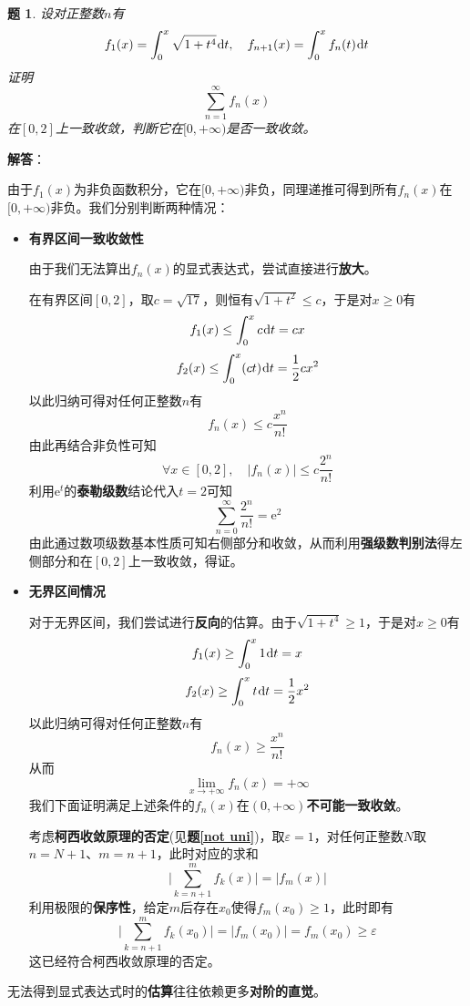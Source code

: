 \documentclass[a4paper,UTF8,fontset=windows,AutoFakeBold]{ctexart}
\newcommand*{\dr}{\hspace{0.07em}\mathrm{d}}
\newcommand*{\er}{\mathrm{e}}
\newcommand*{\suminf}[1][n=1]{\sum_{#1}^\infty}
\newcommand*{\note}{\noindent *}
\theoremstyle{ex}
\newtheorem{exercise}{题}
\newcommand{\exref}[1]{\textbf{题\;\ref{#1}\;}}
\newcommand{\sol}[1]{{\vspace{5pt}\kaishu\noindent\textbf{解答}：\vspace{-3pt}
\begin{compactitem}
    \item[] #1
\end{compactitem}
}}
\begin{document}
\begin{framed}
\begin{exercise}
    设对正整数$n$有
    $$f_1(x)=\int_0^x\sqrt{1+t^4}\dr t,\quad f_{n+1}(x)=\int_0^xf_n(t)\dr t$$
    证明
    $$\suminf f_n(x)$$
    在$[0,2]$上一致收敛，判断它在$[0,+\infty)$是否一致收敛。
\end{exercise}
\sol{
    由于$f_1(x)$为非负函数积分，它在$[0,+\infty)$非负，同理递推可得到所有$f_n(x)$在$[0,+\infty)$非负。我们分别判断两种情况：
    \begin{itemize}
        \item \textbf{有界区间一致收敛性}
        
        由于我们无法算出$f_n(x)$的显式表达式，尝试直接进行\textbf{放大}。

        在有界区间$[0,2]$，取$c=\sqrt{17}$，则恒有$\sqrt{1+t^2}\le c$，于是对$x\ge0$有
        $$f_1(x)\le\int_0^xc\dr t=cx$$
        $$f_2(x)\le\int_0^x(ct)\dr t=\frac{1}{2}cx^2$$
        以此归纳可得对任何正整数$n$有
        $$f_n(x)\le c\frac{x^n}{n!}$$
        由此再结合非负性可知
        $$\forall x\in[0,2],\quad|f_n(x)|\le c\frac{2^n}{n!}$$
        利用$\er^t$的\textbf{泰勒级数}结论代入$t=2$可知
        $$\suminf[n=0]\frac{2^n}{n!}=\er^2$$
        由此通过数项级数基本性质可知右侧部分和收敛，从而利用\textbf{强级数判别法}得左侧部分和在$[0,2]$上一致收敛，得证。

        \item \textbf{无界区间情况}
        
        对于无界区间，我们尝试进行\textbf{反向}的估算。由于$\sqrt{1+t^4}\ge1$，于是对$x\ge0$有
        $$f_1(x)\ge\int_0^x1\dr t=x$$
        $$f_2(x)\ge\int_0^xt\dr t=\frac{1}{2}x^2$$
        以此归纳可得对任何正整数$n$有
        $$f_n(x)\ge\frac{x^n}{n!}$$
        从而
        $$\lim_{x\to+\infty}f_n(x)=+\infty$$
        我们下面证明满足上述条件的$f_n(x)$在$(0,+\infty)$\textbf{不可能一致收敛}。

        考虑\textbf{柯西收敛原理的否定}(见\exref{not uni})，取$\varepsilon=1$，对任何正整数$N$取$n=N+1$、$m=n+1$，此时对应的求和
        $$\bigg|\sum_{k=n+1}^mf_k(x)\bigg|=|f_m(x)|$$
        利用极限的\textbf{保序性}，给定$m$后存在$x_0$使得$f_m(x_0)\ge1$，此时即有
        $$\bigg|\sum_{k=n+1}^mf_k(x_0)\bigg|=|f_m(x_0)|=f_m(x_0)\ge\varepsilon$$
        这已经符合柯西收敛原理的否定。
    \end{itemize}
}
\end{framed}

\note 无法得到显式表达式时的\textbf{估算}往往依赖更多\textbf{对阶的直觉}。
\end{document}
